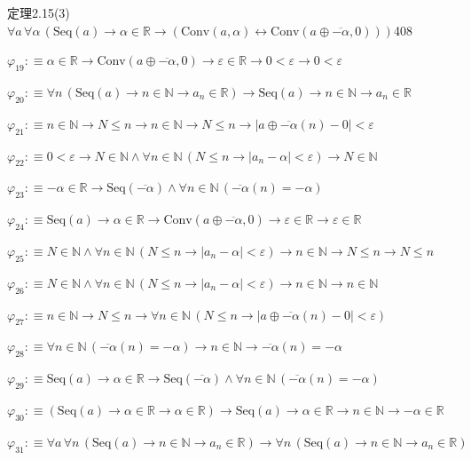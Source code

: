 \begin{fullproof}{定理2.15(3)}{$\forall a\,\forall \alpha\,(\mathrm{Seq}(a) \to \alpha \in \mathbb{R} \to (\mathrm{Conv}(a,\alpha) \leftrightarrow \mathrm{Conv}(a \oplus \overline{-\alpha},0)))$}{408}
\begin{abbrevlist}
\item $\varphi_{19} :\equiv \alpha \in \mathbb{R} \to \mathrm{Conv}(a \oplus \overline{-\alpha},0) \to \varepsilon \in \mathbb{R} \to 0 < \varepsilon \to 0 < \varepsilon$
\item $\varphi_{20} :\equiv \forall n\,(\mathrm{Seq}(a) \to n \in \mathbb{N} \to a_{n} \in \mathbb{R}) \to \mathrm{Seq}(a) \to n \in \mathbb{N} \to a_{n} \in \mathbb{R}$
\item $\varphi_{21} :\equiv n \in \mathbb{N} \to N \leq n \to n \in \mathbb{N} \to N \leq n \to \lvert a \oplus \overline{-\alpha}(n) - 0 \rvert < \varepsilon$
\item $\varphi_{22} :\equiv 0 < \varepsilon \to N \in \mathbb{N} \land \forall n \in \mathbb{N}\,(N \leq n \to \lvert a_{n} - \alpha \rvert < \varepsilon) \to N \in \mathbb{N}$
\item $\varphi_{23} :\equiv -\alpha \in \mathbb{R} \to \mathrm{Seq}(\overline{-\alpha}) \land \forall n \in \mathbb{N}\,(\overline{-\alpha}(n) = -\alpha)$
\item $\varphi_{24} :\equiv \mathrm{Seq}(a) \to \alpha \in \mathbb{R} \to \mathrm{Conv}(a \oplus \overline{-\alpha},0) \to \varepsilon \in \mathbb{R} \to \varepsilon \in \mathbb{R}$
\item $\varphi_{25} :\equiv N \in \mathbb{N} \land \forall n \in \mathbb{N}\,(N \leq n \to \lvert a_{n} - \alpha \rvert < \varepsilon) \to n \in \mathbb{N} \to N \leq n \to N \leq n$
\item $\varphi_{26} :\equiv N \in \mathbb{N} \land \forall n \in \mathbb{N}\,(N \leq n \to \lvert a_{n} - \alpha \rvert < \varepsilon) \to n \in \mathbb{N} \to n \in \mathbb{N}$
\item $\varphi_{27} :\equiv n \in \mathbb{N} \to N \leq n \to \forall n \in \mathbb{N}\,(N \leq n \to \lvert a \oplus \overline{-\alpha}(n) - 0 \rvert < \varepsilon)$
\item $\varphi_{28} :\equiv \forall n \in \mathbb{N}\,(\overline{-\alpha}(n) = -\alpha) \to n \in \mathbb{N} \to \overline{-\alpha}(n) = -\alpha$
\item $\varphi_{29} :\equiv \mathrm{Seq}(a) \to \alpha \in \mathbb{R} \to \mathrm{Seq}(\overline{-\alpha}) \land \forall n \in \mathbb{N}\,(\overline{-\alpha}(n) = -\alpha)$
\item $\varphi_{30} :\equiv (\mathrm{Seq}(a) \to \alpha \in \mathbb{R} \to \alpha \in \mathbb{R}) \to \mathrm{Seq}(a) \to \alpha \in \mathbb{R} \to n \in \mathbb{N} \to -\alpha \in \mathbb{R}$
\item $\varphi_{31} :\equiv \forall a\,\forall n\,(\mathrm{Seq}(a) \to n \in \mathbb{N} \to a_{n} \in \mathbb{R}) \to \forall n\,(\mathrm{Seq}(a) \to n \in \mathbb{N} \to a_{n} \in \mathbb{R})$

\end{abbrevlist}
\end{fullproof}
